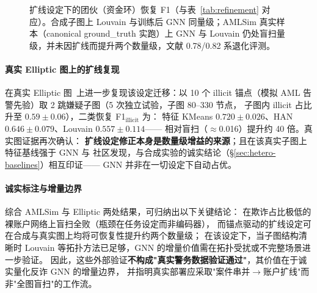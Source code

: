 \documentclass[12pt,a4paper]{ctexart}
\begin{document}
\begin{figure}[H]
  \centering
  \caption{扩线设定下的团伙（资金环）恢复 F1（与表~\ref{tab:refinement} 对应）。合成子图上 Louvain 与训练后 GNN 同量级；AMLSim 真实样本（canonical ground\_truth 实跑）上 GNN 与 Louvain 仍处盲扫量级，并未因扩线而提升两个数量级，文献 0.78/0.82 系退化评测。}
  \label{fig:refinement}
\end{figure}

\paragraph{真实 Elliptic 图上的扩线复现}
在真实 Elliptic 图~\cite{weber2019elliptic}上进一步复现该设定迁移：以 10 个
illicit 锚点（模拟 AML 告警先验）取 2 跳嫌疑子图（5 次独立试验，子图 80--330 节点，
子图内 illicit 占比升至 $0.59\pm0.06$），二类恢复 F1$_{\text{illicit}}$ 为：
特征 KMeans $0.720\pm0.026$、HAN $0.646\pm0.079$、Louvain $0.557\pm0.114$——
相对盲扫（$\approx$0.016）提升约 40 倍。真实图证据再次确认：
\textbf{扩线设定修正本身是数量级增益的来源}；且在该真实子图上特征基线强于 GNN 与
社区发现，与合成实验的诚实结论（§\ref{sec:hetero-baselines}）相互印证——
GNN 并非在一切设定下自动占优。

\paragraph{诚实标注与增量边界}
综合 AMLSim 与 Elliptic 两处结果，可归纳出以下关键结论：
在欺诈占比极低的裸账户网络上盲扫全败（瓶颈在任务设定而非编码器），
而锚点驱动的扩线设定可在合成与真实图上均将可恢复性提升约两个数量级；
在该设定下，当子图结构清晰时 Louvain 等拓扑方法已足够，GNN 的增量价值需在拓扑受扰或不完整场景进一步验证。
因此，这些外部验证\textbf{不构成"真实警务数据验证通过"}，其价值在于诚实量化反诈 GNN 的增量边界，
并指明真实部署应采取"案件串并$\to$账户扩线"而非"全图盲扫"的工作流。
\end{document}
